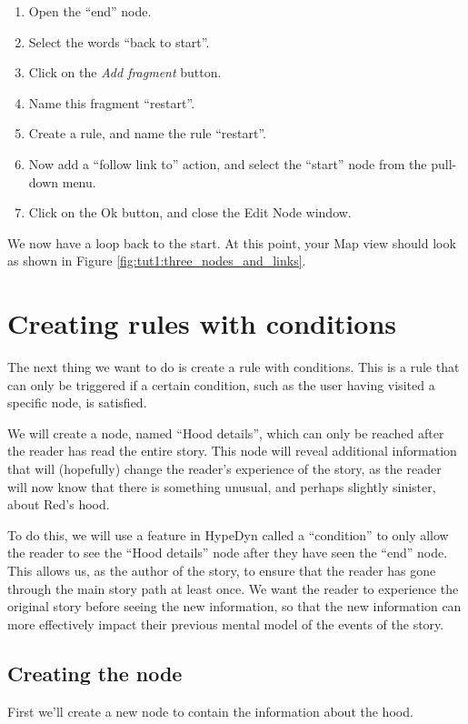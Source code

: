 \documentclass{article}
\begin{document}
\begin{enumerate}
\item Open the ``end'' node.
\item Select the words ``back to start''.
\item Click on the \textit{Add fragment} button.
\item Name this fragment ``restart''.
\item Create a rule, and name the rule ``restart''.
\item Now add a ``follow link to'' action, and select the ``start'' node from the pull-down menu.
\item Click on the Ok button, and close the Edit Node window.
\end{enumerate}

We now have a loop back to the start. At this point, your Map view should look as shown in Figure \ref{fig:tut1:three_nodes_and_links}.

\section{Creating rules with conditions}

The next thing we want to do is create a rule with conditions. This is a rule that can only be triggered if a certain condition, such as the user having visited a specific node, is satisfied.

We will create a node, named ``Hood details'', which can only be reached after the reader has read the entire story. This node will reveal additional information that will (hopefully) change the reader's experience of the story, as the reader will now know that there is something unusual, and perhaps slightly sinister, about Red's hood.

To do this, we will use a feature in HypeDyn called a ``condition'' to only allow the reader to see the ``Hood details'' node after they have seen the ``end'' node. This allows us, as the author of the story, to ensure that the reader has gone through the main story path at least once. We want the reader to experience the original story before seeing the new information, so that the new information can more effectively impact their previous mental model of the events of the story.

\subsection{Creating the node}

First we'll create a new node to contain the information about the hood.
\end{document}
